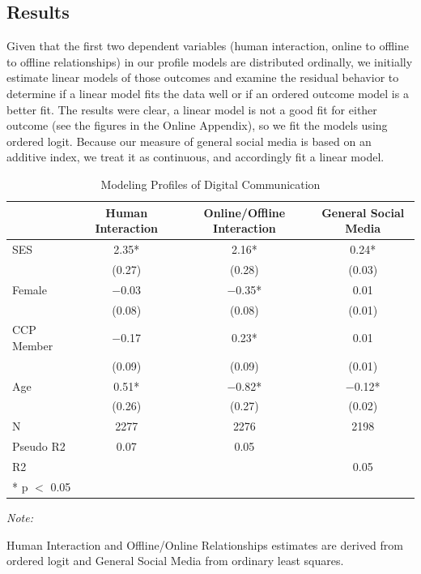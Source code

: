 \documentclass[]{interact}
\theoremstyle{plain}%
\theoremstyle{definition}
\theoremstyle{remark}
\begin{document}
\hypertarget{results}{%
\subsection{Results}\label{results}}

Given that the first two dependent variables (human interaction, online
to offline to offline relationships) in our profile models are
distributed ordinally, we initially estimate linear models of those
outcomes and examine the residual behavior to determine if a linear
model fits the data well or if an ordered outcome model is a better fit.
The results were clear, a linear model is not a good fit for either
outcome (see the figures in the Online Appendix), so we fit the models
using ordered logit. Because our measure of general social media is
based on an additive index, we treat it as continuous, and accordingly
fit a linear model.

\hypertarget{tbl-profile-models}{}
\begin{table}
\caption{\label{tbl-profile-models}Modeling Profiles of Digital Communication }\tabularnewline

\centering
\begin{threeparttable}
\begin{tabular}[t]{lccc}
\toprule
  & Human Interaction & Online/Offline Interaction & General Social Media\\
\midrule
SES & \num{2.35}* & \num{2.16}* & \num{0.24}*\\
 & (\num{0.27}) & (\num{0.28}) & (\num{0.03})\\
Female & \num{-0.03} & \num{-0.35}* & \num{0.01}\\
 & (\num{0.08}) & (\num{0.08}) & (\num{0.01})\\
CCP Member & \num{-0.17} & \num{0.23}* & \num{0.01}\\
 & (\num{0.09}) & (\num{0.09}) & (\num{0.01})\\
Age & \num{0.51}* & \num{-0.82}* & \num{-0.12}*\\
 & (\num{0.26}) & (\num{0.27}) & (\num{0.02})\\
\midrule
N & \num{2277} & \num{2276} & \num{2198}\\
Pseudo R2 & \num{0.07} & \num{0.05} & \\
R2 &  &  & \num{0.05}\\
\bottomrule
\multicolumn{4}{l}{\rule{0pt}{1em}* p $<$ 0.05}\\
\end{tabular}
\begin{tablenotes}
\item \textit{Note: } 
\item Human Interaction and Offline/Online Relationships estimates are derived from ordered logit and General Social Media from ordinary least squares.
\end{tablenotes}
\end{threeparttable}
\end{table}
\end{document}
